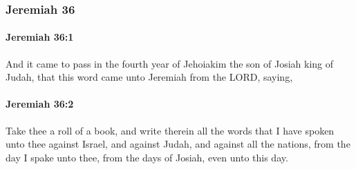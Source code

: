 	\subsubsection{Jeremiah 36} %
		\label{JEREMIAH-36}

		\paragraph{Jeremiah 36:1} %
			\label{JEREMIAH-36-1}

			And it came to pass in the fourth year of Jehoiakim the son of Josiah king of Judah, that this word came unto Jeremiah from the LORD, saying,


		\paragraph{Jeremiah 36:2} %
			\label{JEREMIAH-36-2}

			Take thee a roll of a book, and write therein all the words that I have spoken unto thee against Israel, and against Judah, and against all the nations, from the day I spake unto thee, from the days of Josiah, even unto this day.

